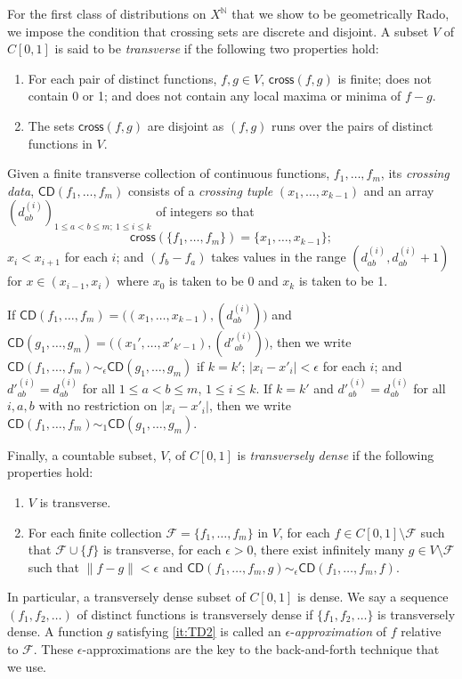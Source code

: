 \documentclass{daj}
\newcommand{\N}{\mathbb N}
\newcommand{\cross}{\mathsf{cross}}
\newcommand{\CD}{\mathsf{CD}}
\begin{document}
For the first class of distributions on $X^\N$ that we show to be geometrically Rado,
we impose the condition that crossing sets are discrete and disjoint.
A subset $V$ of $C[0,1]$ is said to be \emph{transverse} if the following two properties hold:
\begin{enumerate}[label=(Tr\arabic*)]
\item For each pair of distinct functions, $f,g\in V$, $\cross(f,g)$ is finite;
does not contain 0 or 1; and does not
contain any local maxima or minima of $f-g$.
\label{it:Tr1}
\item The sets $\cross(f,g)$ are disjoint as $(f,g)$ runs over the pairs of distinct functions in $V$.
\label{it:Tr2}
\end{enumerate}

Given a finite transverse collection of continuous functions, $f_1,\ldots,f_m$,
its \emph{crossing data}, $\CD(f_1,\ldots,f_m)$ consists of
a \emph{crossing tuple} $(x_1,\ldots,x_{k-1})$ and an array
$(d_{ab}^{(i)})_{1\le a<b\le m;\ 1\le i\le k}$ of integers
so that $$\cross(\{f_1,\ldots,f_m\})=\{x_1,\ldots,x_{k-1}\};$$ $x_i<x_{i+1}$ for each $i$; and
$(f_b-f_a)$ takes values in the range $(d_{ab}^{(i)},d_{ab}^{(i)}+1)$ for
$x\in (x_{i-1},x_i)$ where $x_0$ is taken to be
0 and $x_{k}$ is taken to be 1.

If $\CD(f_1,\ldots,f_m)=\Big((x_1,\ldots,x_{k-1}),(d_{ab}^{(i)})\Big)$ and $\CD(g_1,\ldots,g_m)=
\Big((x_1',\ldots,x'_{k'-1}),({d'}_{ab}^{(i)})\Big)$, then we write
$\CD(f_1,\ldots,f_m)\sim_\epsilon \CD(g_1,\ldots,g_m)$ if $k=k'$;
$|x_i-x'_i|<\epsilon$ for each $i$; and ${d'}_{ab}^{(i)}=d_{ab}^{(i)}$ for all $1\le a<b\le m$,
$1\le i\le k$. If $k=k'$ and ${d'}_{ab}^{(i)}=d_{ab}^{(i)}$ for all $i,a,b$ with no restriction on $|x_i-x'_i|$, then we
write $\CD(f_1,\ldots,f_m)\sim_1 \CD(g_1,\ldots,g_m)$.

Finally, a countable subset, $V$, of $C[0,1]$ is \emph{transversely dense} if the following properties hold:
\begin{enumerate}[label=(TD\arabic*)]
\item $V$ is transverse.
\item \label{it:TD2}
For each finite collection $\mathcal F=\{f_1,\ldots,f_m\}$ in $V$, for
each $f\in C[0,1]\setminus \mathcal F$ such that
$\mathcal F\cup\{f\}$ is transverse, for each $\epsilon>0$, there exist
infinitely many $g\in V\setminus\mathcal F$
such that $\|f-g\|<\epsilon$ and $\CD(f_1,\ldots,f_m,g)\sim_\epsilon \CD(f_1,\ldots,f_m,f)$.
\end{enumerate}
In particular, a transversely dense subset of $C[0,1]$ is dense.
We say a sequence $(f_1,f_2,\ldots)$ of distinct functions is transversely dense if
$\{f_1,f_2,\ldots\}$ is transversely dense.
A function $g$ satisfying \ref{it:TD2} is called an $\epsilon$-\emph{approximation} of $f$ relative to $\mathcal F$.
These $\epsilon$-approximations are the key to the back-and-forth technique that we use.
\end{document}
